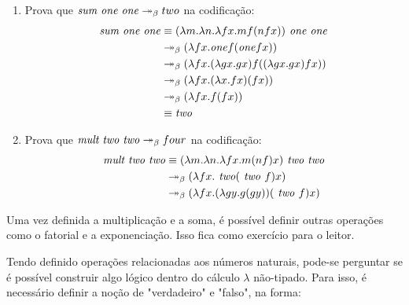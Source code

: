 \documentclass[../main.tex]{subfiles}
\begin{document}
\begin{enumerate}
    \item Prova que $\text{\emph{sum one one}} \twoheadrightarrow_{\beta} two$ na codificação:
    \begin{equation*}
        \begin{split}
            \text{\emph{sum one one}} & \equiv (\lambda m . \lambda n . \lambda fx . m f(nfx)) \text{\emph{ one one}}
                                   \\ & \twoheadrightarrow_{\beta} ( \lambda fx . \text{\emph{one}} f(\text{\emph{one}}fx))
                                   \\ & \twoheadrightarrow_{\beta} ( \lambda fx . (\lambda gx . gx) f((\lambda gx . gx)fx))
                                   \\ & \twoheadrightarrow_{\beta} ( \lambda fx . (\lambda x . fx) (fx))
                                   \\ & \twoheadrightarrow_{\beta} ( \lambda fx . f(fx))
                                   \\ & \equiv \text{\emph{two}}
        \end{split}
    \end{equation*}
    \item Prova que $\text{\emph{mult two two}} \twoheadrightarrow_{\beta} four$ na codificação:
    \begin{equation*}
        \begin{split}
            \text{\emph{mult two two}} & \equiv (\lambda m . \lambda n . \lambda fx . m (nf) x) \text{\emph{ two two}}
                                   \\ & \twoheadrightarrow_{\beta} (\lambda fx . \text{\emph{ two}} (\text{\emph{ two }}f) x)
                                   \\ & \twoheadrightarrow_{\beta} (\lambda fx . (\lambda gy . g(gy) )(\text{\emph{ two }}f) x)
        \end{split}
    \end{equation*}
\end{enumerate}

Uma vez definida a multiplicação e a soma, é possível definir outras operações como o fatorial e a exponenciação. Isso fica como exercício para o leitor.

Tendo definido operações relacionadas aos números naturais, pode-se perguntar se é possível construir algo lógico dentro do cálculo $\lambda$ não-tipado. Para isso, é necessário definir a noção de "verdadeiro" e "falso", na forma:
\end{document}
